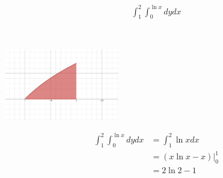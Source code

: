 \begin{align*}
    \int_{1}^{2} \int_{0}^{\ln{x}} dy dx
\end{align*}

\begin{solution} \
    \begin{center}
        \includegraphics[width=0.375\textwidth]{img/e1p2.png}
    \end{center}
    
    \begin{align*}
        \int_{1}^{2} \int_{0}^{\ln{x}} dy dx &= \int_{1}^{2} \ln{x} dx \\
        &= \left(x\ln{x} - x\right) \bigg|_{0}^{1} \\
        &= 2 \ln{2} - 1
    \end{align*}
\end{solution}